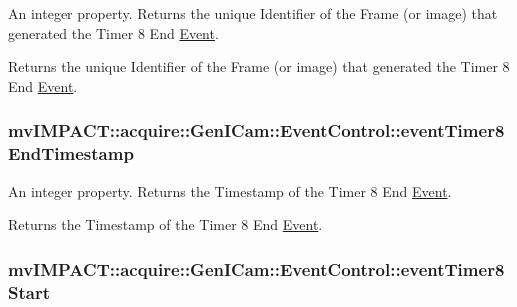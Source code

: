 An integer property. Returns the unique Identifier of the Frame (or image) that generated the Timer 8 End \hyperlink{classmv_i_m_p_a_c_t_1_1acquire_1_1_event}{Event}. 

Returns the unique Identifier of the Frame (or image) that generated the Timer 8 End \hyperlink{classmv_i_m_p_a_c_t_1_1acquire_1_1_event}{Event}. \hypertarget{classmv_i_m_p_a_c_t_1_1acquire_1_1_gen_i_cam_1_1_event_control_a9f9a719d858666dff7808b33f6da69ba}{
\subsubsection[{event\+Timer8\+End\+Timestamp}]{ mv\+I\+M\+P\+A\+C\+T\+::acquire\+::\+Gen\+I\+Cam\+::\+Event\+Control\+::event\+Timer8\+End\+Timestamp}}\label{classmv_i_m_p_a_c_t_1_1acquire_1_1_gen_i_cam_1_1_event_control_a9f9a719d858666dff7808b33f6da69ba}


An integer property. Returns the Timestamp of the Timer 8 End \hyperlink{classmv_i_m_p_a_c_t_1_1acquire_1_1_event}{Event}. 

Returns the Timestamp of the Timer 8 End \hyperlink{classmv_i_m_p_a_c_t_1_1acquire_1_1_event}{Event}. \hypertarget{classmv_i_m_p_a_c_t_1_1acquire_1_1_gen_i_cam_1_1_event_control_ad3074f3699810be7456db69a7d8df41d}{
\subsubsection[{event\+Timer8\+Start}]{ mv\+I\+M\+P\+A\+C\+T\+::acquire\+::\+Gen\+I\+Cam\+::\+Event\+Control\+::event\+Timer8\+Start}}\label{classmv_i_m_p_a_c_t_1_1acquire_1_1_gen_i_cam_1_1_event_control_ad3074f3699810be7456db69a7d8df41d}


